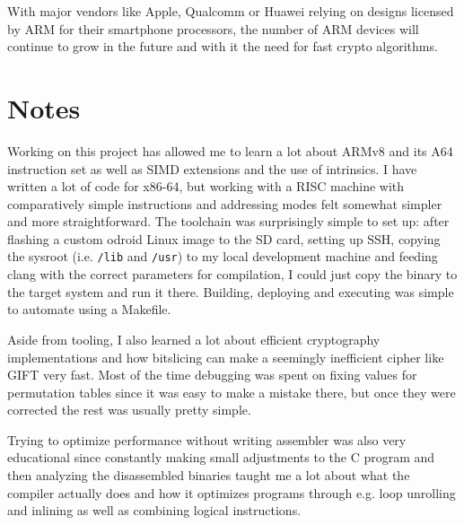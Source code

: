 With major vendors like Apple, Qualcomm or Huawei relying on designs licensed
by ARM for their smartphone processors, the number of ARM devices will continue
to grow in the future and with it the need for fast crypto algorithms.

\pagebreak

\section{Notes}

Working on this project has allowed me to learn a lot about ARMv8 and its A64
instruction set as well as SIMD extensions and the use of intrinsics. I have
written a lot of code for x86-64, but working with a RISC machine with
comparatively simple instructions and addressing modes felt somewhat simpler
and more straightforward. The toolchain was surprisingly simple to set up:
after flashing a custom odroid Linux image to the SD card, setting up SSH,
copying the sysroot (i.e. \texttt{/lib} and \texttt{/usr}) to my local
development machine and feeding clang with the correct parameters for
compilation, I could just copy the binary to the target system and run it
there. Building, deploying and executing was simple to automate using a
Makefile.

Aside from tooling, I also learned a lot about efficient cryptography
implementations and how bitslicing can make a seemingly inefficient cipher like
GIFT very fast. Most of the time debugging was spent on fixing values for
permutation tables since it was easy to make a mistake there, but once they
were corrected the rest was usually pretty simple.

Trying to optimize performance without writing assembler was also very
educational since constantly making small adjustments to the C program and then
analyzing the disassembled binaries taught me a lot about what the compiler
actually does and how it optimizes programs through e.g. loop unrolling and
inlining as well as combining logical instructions.
